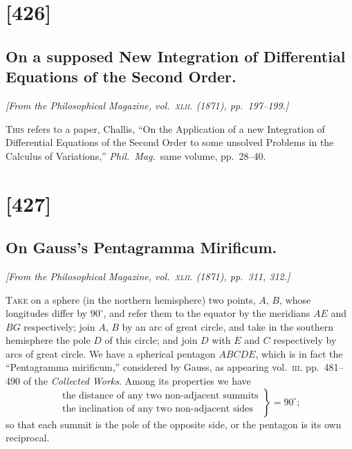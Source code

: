 \documentclass[11pt,a4paper]{article}
\theoremstyle{plain}
\theoremstyle{definition}
\begin{document}
\clearpage

\section{[426]}
\subsection{On a supposed New Integration of Differential Equations of the Second Order.}

\begin{center}
\textit{[From the Philosophical Magazine, vol.~\textsc{xlii}. (1871), pp.~197--199.]}
\end{center}

\textsc{This} refers to a paper, Challis, ``On the Application of a new Integration of Differential
Equations of the Second Order to some unsolved Problems in the Calculus of Variations,''
\textit{Phil.\ Mag.}\ same volume, pp.~28--40.

\clearpage

\section{[427]}
\subsection{On Gauss's Pentagramma Mirificum.}

\begin{center}
\textit{[From the Philosophical Magazine, vol.~\textsc{xlii}. (1871), pp.~311, 312.]}
\end{center}

\textsc{Take} on a sphere (in the northern hemisphere) two points, $A$, $B$, whose longitudes
differ by $90^\circ$, and refer them to the equator by the meridians $AE$ and $BG$ respectively;
join $A$, $B$ by an arc of great circle, and take in the southern hemisphere the pole
$D$ of this circle; and join $D$ with $E$ and $C$ respectively by arcs of great circle.  We
have a spherical pentagon $ABCDE$, which is in fact the ``Pentagramma mirificum,''
considered by Gauss, as appearing vol.~\textsc{iii}. pp.~481--490 of the \textit{Collected Works}.  Among
its properties we have
\[
\left.
\begin{array}{l}
\text{the distance of any two non-adjacent summits} \\
\text{the inclination of any two non-adjacent sides}
\end{array}
\right\} = 90^\circ;
\]
so that each summit is the pole of the opposite side, or the pentagon is its own
reciprocal.
\end{document}

